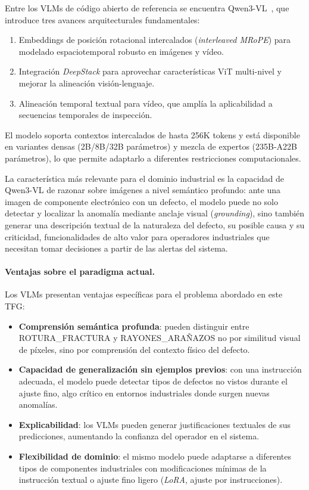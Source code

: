 Entre los VLMs de código abierto de referencia se encuentra Qwen3-VL~\cite{bai2025qwen3vl}, que introduce tres avances arquitecturales fundamentales:
\begin{enumerate}
    \item Embeddings de posición rotacional intercalados (\textit{interleaved MRoPE}) para modelado espaciotemporal robusto en imágenes y vídeo.
    \item Integración \textit{DeepStack} para aprovechar características ViT multi-nivel y mejorar la alineación visión-lenguaje.
    \item Alineación temporal textual para vídeo, que amplía la aplicabilidad a secuencias temporales de inspección.
\end{enumerate}
El modelo soporta contextos intercalados de hasta 256K tokens y está disponible en variantes densas (2B/8B/32B parámetros) y mezcla de expertos (235B-A22B parámetros), lo que permite adaptarlo a diferentes restricciones computacionales.

La característica más relevante para el dominio industrial es la capacidad de Qwen3-VL de razonar sobre imágenes a nivel semántico profundo: ante una imagen de componente electrónico con un defecto, el modelo puede no solo detectar y localizar la anomalía mediante anclaje visual (\textit{grounding}), sino también generar una descripción textual de la naturaleza del defecto, su posible causa y su criticidad, funcionalidades de alto valor para operadores industriales que necesitan tomar decisiones a partir de las alertas del sistema.

\paragraph{Ventajas sobre el paradigma actual.}

Los VLMs presentan ventajas específicas para el problema abordado en este TFG:

\begin{itemize}
    \item \textbf{Comprensión semántica profunda}: pueden distinguir entre \mbox{ROTURA\_FRACTURA} y \mbox{RAYONES\_ARAÑAZOS} no por similitud visual de píxeles, sino por comprensión del contexto físico del defecto.
    \item \textbf{Capacidad de generalización sin ejemplos previos}: con una instrucción adecuada, el modelo puede detectar tipos de defectos no vistos durante el ajuste fino, algo crítico en entornos industriales donde surgen nuevas anomalías.
    \item \textbf{Explicabilidad}: los VLMs pueden generar justificaciones textuales de sus predicciones, aumentando la confianza del operador en el sistema.
    \item \textbf{Flexibilidad de dominio}: el mismo modelo puede adaptarse a diferentes tipos de componentes industriales con modificaciones mínimas de la instrucción textual o ajuste fino ligero (\textit{LoRA}, ajuste por instrucciones).
\end{itemize}

